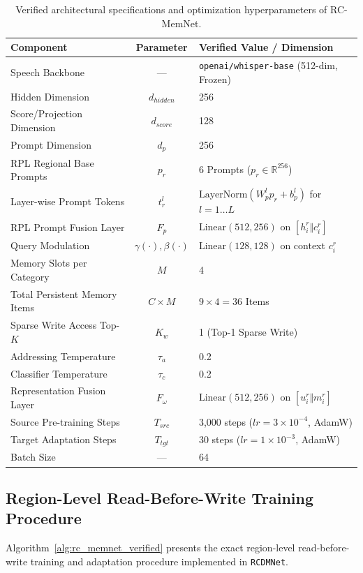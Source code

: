 \documentclass[letterpaper]{article}
\begin{document}
\begin{table}[h]
\centering
\caption{Verified architectural specifications and optimization hyperparameters of RC-MemNet.}
\label{tab:supp_verified_hyperparams}
\small
\renewcommand{\arraystretch}{1.08}
\begin{tabular*}{\linewidth}{@{\extracolsep{\fill}}l c l@{}}
\toprule
Component & Parameter & Verified Value / Dimension \\
\midrule
Speech Backbone & --- & \texttt{openai/whisper-base} (512-dim, Frozen) \\
Hidden Dimension & $d_{hidden}$ & 256 \\
Score/Projection Dimension & $d_{score}$ & 128 \\
Prompt Dimension & $d_p$ & 256 \\
RPL Regional Base Prompts & $p_r$ & 6 Prompts ($p_r \in \mathbb{R}^{256}$) \\
Layer-wise Prompt Tokens & $t_r^l$ & $\text{LayerNorm}(W_p^l p_r + b_p^l)$ for $l=1\dots L$ \\
RPL Prompt Fusion Layer & $F_p$ & $\text{Linear}(512, 256)$ on $[h_i^r \Vert c_i^r]$ \\
Query Modulation & $\gamma(\cdot), \beta(\cdot)$ & $\text{Linear}(128, 128)$ on context $c_i^r$ \\
Memory Slots per Category & $M$ & 4 \\
Total Persistent Memory Items & $C \times M$ & $9 \times 4 = 36$ Items \\
Sparse Write Access Top-$K$ & $K_w$ & 1 (Top-1 Sparse Write) \\
Addressing Temperature & $\tau_a$ & 0.2 \\
Classifier Temperature & $\tau_c$ & 0.2 \\
Representation Fusion Layer & $F_\omega$ & $\text{Linear}(512, 256)$ on $[u_i^r \Vert m_i^r]$ \\
Source Pre-training Steps & $T_{src}$ & 3,000 steps ($lr = 3\times 10^{-4}$, AdamW) \\
Target Adaptation Steps & $T_{tgt}$ & 30 steps ($lr = 1\times 10^{-3}$, AdamW) \\
Batch Size & --- & 64 \\
\bottomrule
\end{tabular*}
\end{table}

\subsection{Region-Level Read-Before-Write Training Procedure}
Algorithm~\ref{alg:rc_memnet_verified} presents the exact region-level read-before-write training and adaptation procedure implemented in \texttt{RCDMNet}.
\end{document}
